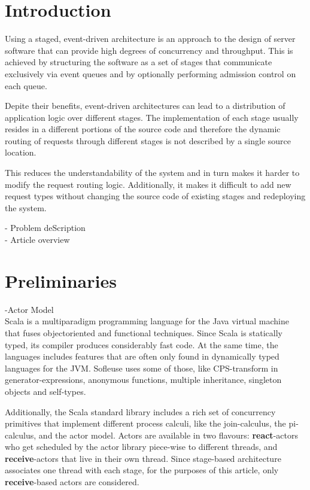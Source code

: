 \documentclass{sig-alternate}
\begin{document}
\section{Introduction}             

Using a staged, event-driven architecture is an approach to the design of server software that can 
provide high degrees of concurrency and throughput.  This is achieved by structuring the software as
a set of stages that communicate exclusively via event queues and by optionally performing admission 
control on each queue.  


Depite their benefits, event-driven architectures can lead to a distribution of application logic
over different stages. The implementation of each stage usually resides in a different portions of
the source code and therefore the dynamic routing of requests through different stages is not
described by a single source location.

This reduces the understandability of the system and in turn makes it harder to modify the request
routing logic. Additionally, it makes it difficult to add new request types without changing the
source code of existing stages and redeploying the system.

- Problem deScription\\

- Article overview\\
                                
                         
\section{Preliminaries}

-Actor Model \\

Scala is a multiparadigm programming language for the Java virtual machine that fuses objectoriented
and functional techniques. Since Scala is statically typed, its compiler produces considerably fast
code. At the same time, the languages includes features that are often only found in dynamically
typed languages for the JVM. Sofleuse uses some of those, like CPS-transform in
generator-expressions, anonymous functions, multiple inheritance, singleton objects and self-types.

Additionally, the Scala standard library includes a rich set of concurrency primitives that
implement different process calculi, like the join-calculus, the pi-calculus, and the actor model.
Actors are available in two flavours: \textbf{react}-actors who get scheduled by the actor library
piece-wise to different threads, and \textbf{receive}-actors that live in their own thread. Since
stage-based architecture associates one thread with each stage, for the purposes of this article, 
only \textbf{receive}-based actors are considered.
\end{document}
